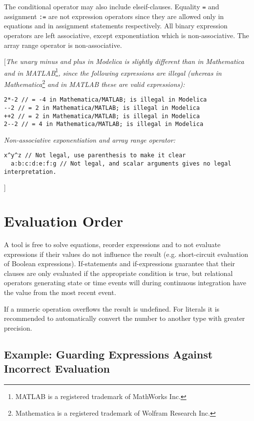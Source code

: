 The conditional operator may also include elseif-clauses. Equality \lstinline[basicstyle=\ttfamily]!=! and
assignment \lstinline[basicstyle=\ttfamily]!:=! are not expression operators since they are allowed only
in equations and in assignment statements respectively. All binary
expression operators are left associative, except exponentiation which
is non-associative. The array range operator is non-associative.

{[}\emph{The unary minus and plus in Modelica is slightly different than
in Mathematica and in MATLAB}\footnote{MATLAB is a registered trademark
  of MathWorks Inc.}\emph{, since the following expressions are illegal
(whereas in Mathematica}\footnote{Mathematica is a registered trademark
  of Wolfram Research Inc.} \emph{and in MATLAB these are valid
expressions):}
\begin{lstlisting}[language=modelica]
2*-2 // = -4 in Mathematica/MATLAB; is illegal in Modelica
--2 // = 2 in Mathematica/MATLAB; is illegal in Modelica
++2 // = 2 in Mathematica/MATLAB; is illegal in Modelica
2--2 // = 4 in Mathematica/MATLAB; is illegal in Modelica
\end{lstlisting}

\emph{Non-associative exponentiation and array range operator:}

\begin{lstlisting}[language=modelica]
  x^y^z // Not legal, use parenthesis to make it clear
  a:b:c:d:e:f:g // Not legal, and scalar arguments gives no legal interpretation.
\end{lstlisting}
{]}

\section{Evaluation Order}

A tool is free to solve equations, reorder expressions and to not
evaluate expressions if their values do not influence the result (e.g.
short-circuit evaluation of Boolean expressions). If-statements and
if-expressions guarantee that their clauses are only evaluated if the
appropriate condition is true, but relational operators generating state
or time events will during continuous integration have the value from
the most recent event.

If a numeric operation overflows the result is undefined. For literals
it is recommended to automatically convert the number to another type
with greater precision.

\subsection{Example: Guarding Expressions Against Incorrect Evaluation}

